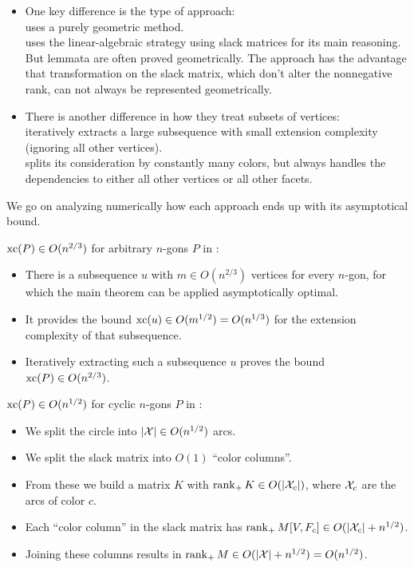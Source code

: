 \begin{itemize}
  \item One key difference is the type of approach:\\
        \cite{shitov2020sublinear} uses a purely geometric method.\\
        \cite{kwan2020extension} uses the linear-algebraic strategy using slack matrices for its main reasoning. But lemmata are often proved geometrically. The approach has the advantage that transformation on the slack matrix, which don't alter the nonnegative rank, can not always be represented geometrically.

  \item There is another difference in how they treat subsets of vertices:\\
        \cite{shitov2020sublinear} iteratively extracts a large subsequence with small extension complexity (ignoring all other vertices).\\
        \cite{kwan2020extension} splits its consideration by constantly many colors, but always handles the dependencies to either all other vertices or all other facets.
\end{itemize}

We go on analyzing numerically how each approach ends up with its asymptotical bound.

$\operatorname{xc}(P) \in O(n^{2/3})$ for arbitrary $n$-gons $P$ in \cite{shitov2020sublinear}:
\begin{itemize}
  \item There is a subsequence $u$ with $m \in O(n^{2/3})$ vertices for every $n$-gon, for which the main theorem can be applied asymptotically optimal.
  \item It provides the bound $\operatorname{xc}(u) \in O(m^{1/2}) = O(n^{1/3})$ for the extension complexity of that subsequence.
  \item Iteratively extracting such a subsequence $u$ proves the bound $\operatorname{xc}(P) \in O(n^{2/3})$.
\end{itemize}

$\operatorname{xc}(P) \in O(n^{1/2})$ for cyclic $n$-gons $P$ in \cite{kwan2020extension}:
\begin{itemize}
  \item We split the circle into $\lvert\mathcal{X}\rvert \in O(n^{1/2})$ arcs.
  \item We split the slack matrix into $O(1)$ ``color columns''.
  \item From these we build a matrix $K$ with $\operatorname{rank}_+ K \in O(\lvert\mathcal{X}_c\rvert)$, where $\mathcal{X}_c$ are the arcs of color $c$.
  \item Each ``color column'' in the slack matrix has $\operatorname{rank}_+ M[V,F_c] \in O(\lvert\mathcal{X}_c\rvert + n^{1/2})$.
  \item Joining these columns results in $\operatorname{rank}_+ M \in O(\lvert\mathcal{X}\rvert + n^{1/2}) = O(n^{1/2})$.
\end{itemize}


